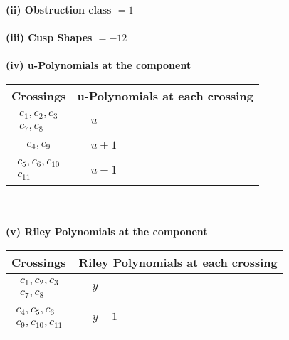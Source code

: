 \documentclass[1p]{elsarticle_modified}
\theoremstyle{definition}
\begin{document}
\flushleft \textbf{(ii) Obstruction class $= 1$}\\~\\
\flushleft \textbf{(iii) Cusp Shapes $= -12$}\\~\\
\newpage\renewcommand{\arraystretch}{1}
\flushleft \textbf{(iv) u-Polynomials at the component}\newline \\
\begin{tabular}{m{50pt}|m{274pt}}
Crossings & \hspace{64pt}u-Polynomials at each crossing \\
\hline $$\begin{aligned}c_{1},c_{2},c_{3}\\c_{7},c_{8}\end{aligned}$$&$\begin{aligned}
&u
\end{aligned}$\\
\hline $$\begin{aligned}c_{4},c_{9}\end{aligned}$$&$\begin{aligned}
&u+1
\end{aligned}$\\
\hline $$\begin{aligned}c_{5},c_{6},c_{10}\\c_{11}\end{aligned}$$&$\begin{aligned}
&u-1
\end{aligned}$\\
\hline
\end{tabular}\\~\\
\newpage\renewcommand{\arraystretch}{1}
\flushleft \textbf{(v) Riley Polynomials at the component}\newline \\
\begin{tabular}{m{50pt}|m{274pt}}
Crossings & \hspace{64pt}Riley Polynomials at each crossing \\
\hline $$\begin{aligned}c_{1},c_{2},c_{3}\\c_{7},c_{8}\end{aligned}$$&$\begin{aligned}
&y
\end{aligned}$\\
\hline $$\begin{aligned}c_{4},c_{5},c_{6}\\c_{9},c_{10},c_{11}\end{aligned}$$&$\begin{aligned}
&y-1
\end{aligned}$\\
\hline
\end{tabular}\\~\\
\end{document}
